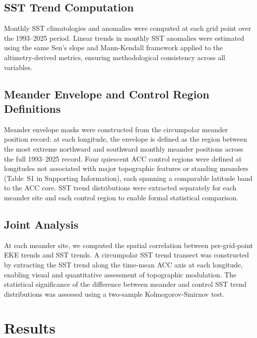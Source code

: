 \documentclass[draft]{agujournal2019}
\begin{document}
\subsection{SST Trend Computation}

Monthly SST climatologies and anomalies were computed at each grid point over the 1993--2025 period.
Linear trends in monthly SST anomalies were estimated using the same Sen's slope and Mann-Kendall framework applied to the altimetry-derived metrics, ensuring methodological consistency across all variables.


\subsection{Meander Envelope and Control Region Definitions}

Meander envelope masks were constructed from the circumpolar meander position record: at each longitude, the envelope is defined as the region between the most extreme northward and southward monthly meander positions across the full 1993--2025 record.
Four quiescent ACC control regions were defined at longitudes not associated with major topographic features or standing meanders (Table~S1 in Supporting Information), each spanning a comparable latitude band to the ACC core.
SST trend distributions were extracted separately for each meander site and each control region to enable formal statistical comparison.


\subsection{Joint Analysis}

At each meander site, we computed the spatial correlation between per-grid-point EKE trends and SST trends.
A circumpolar SST trend transect was constructed by extracting the SST trend along the time-mean ACC axis at each longitude, enabling visual and quantitative assessment of topographic modulation.
The statistical significance of the difference between meander and control SST trend distributions was assessed using a two-sample Kolmogorov-Smirnov test.





\section{Results}
\end{document}
